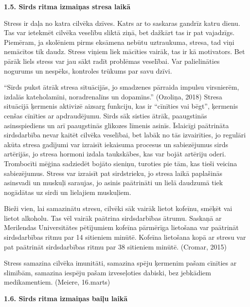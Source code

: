 \documentclass[12pt]{article}
\begin{document}
\begin{center}
{\bf 1.5. Sirds ritma izmaiņas stresa laikā}
\end{center}

Stress ir daļa no katra cilvēka dzīves. Katrs ar to saskaras gandrīz katru dienu. Tas var ietekmēt cilvēka veselību sliktā ziņā, bet dažkārt tas ir pat vajadzīgs. Piemēram, ja skolēniem pirms eksāmena nebūtu uztraukuma, stresa, tad viņi nemācītos tik daudz. Stress viņiem liek mācīties vairāk, tas ir kā motivators. Bet pārāk liels stress var jau sākt radīt problēmas veselībai. Var palielināties nogurums un nespēks, kontroles trūkums par savu dzīvi.\par
“Sirds pukst ātrāk stresa situācijās, jo smadzenes pārraida impulsu virsnierēm, izdalās kateholamīni, noradrenalīns un dopamīns.” (Ozoliņa, 2018) Stresa situācijā ķermenis aktivizē aizsarg funkciju, kas ir  “cīnīties vai bēgt”, ķermenis cenšas cīnīties ar apdraudējumu. Sirds sāk sisties ātrāk, paaugstinās asinsspiediens un arī paaugstinās glikozes līmenis asinīs. Īslaicīgi paātrināta sirdsdarbība nevar kaitēt cilvēka veselībai, bet labāk no tās izvairīties, jo regulāri akūta stresa gadījumi var izraisīt iekaisuma procesus un sabiezējumus sirds artērijās, jo stresa hormoni izdala taukskābes, kas var bojāt artēriju oderi. Trombocīti mēģina sadziedēt bojāto sieniņu, turoties pie tām, kas tieši veicina sabiezējumus. Stress var izraisīt pat sirdstrieku, jo stresa laikā paplašinās asinsvadi un muskuļi saraujas, jo asinis paātrināti un lielā daudzumā tiek nogādātas uz sirdi un lielajiem muskuļiem. \par
Bieži vien, lai samazinātu stresu, cilvēki sāk vairāk lietot kofeīnu, smēķēt vai lietot alkoholu. Tas vēl vairāk paātrina sirdsdarbības ātrumu. Saskaņā ar Merilendas Universitātes pētījumiem kofeīna pārmērīga lietošana var paātrināt sirdsdarbības ritmu par 14 sitieniem minūtē. Kofeīna lietošana kopā ar stresu var pat paātrināt sirdsdarbības ritmu par 38 sitieniem minūtē. (Cromar, 2015) \par
Stress samazina cilvēka imunitāti, samazina spēju ķermenim pašam cīnīties ar slimībām, samazina iespēju pašam izveseļoties dabiski, bez jebkādiem medikamentiem. (Meiere, 16.marts)

\begin{center}
{\bf 1.6. Sirds ritma izmaiņas baiļu laikā}
\end{center}
\end{document}
